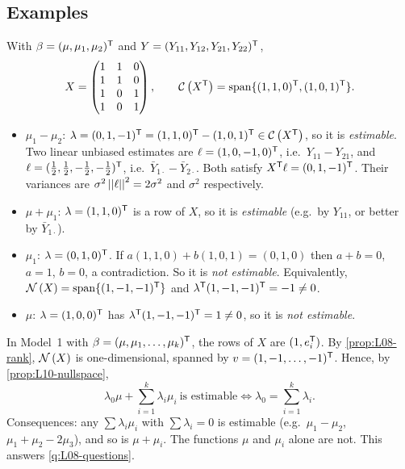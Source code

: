 \subsection{Examples}
\begin{example}[One-way model with $k=2$, $n_1=n_2=2$]\label{ex:L10-oneway}
With $\beta=(\mu,\mu_1,\mu_2)^{\mathsf T}$ and $Y=(Y_{11},Y_{12},Y_{21},Y_{22})^{\mathsf T}$,
\[
X=\begin{pmatrix}1&1&0\\1&1&0\\1&0&1\\1&0&1\end{pmatrix},\qquad
\mathcal{C}\left(X^{\mathsf T}\right)=\mathrm{span}\{(1,1,0)^{\mathsf T},(1,0,1)^{\mathsf T}\}.
\]
\begin{itemize}
  \item $\mu_1-\mu_2$: $\lambda=(0,1,-1)^{\mathsf T}=(1,1,0)^{\mathsf T}-(1,0,1)^{\mathsf T}\in\mathcal{C}\left(X^{\mathsf T}\right)$, so it is \emph{estimable}. Two linear unbiased estimates are $\ell=(1,0,-1,0)^{\mathsf T}$, i.e.\ $Y_{11}-Y_{21}$, and $\ell=(\tfrac12,\tfrac12,-\tfrac12,-\tfrac12)^{\mathsf T}$, i.e.\ $\bar Y_{1\cdot}-\bar Y_{2\cdot}$. Both satisfy $X^{\mathsf T}\ell=(0,1,-1)^{\mathsf T}$. Their variances are $\sigma^2\left|\left|\ell\right|\right|^2=2\sigma^2$ and $\sigma^2$ respectively.
  \item $\mu+\mu_1$: $\lambda=(1,1,0)^{\mathsf T}$ is a row of $X$, so it is \emph{estimable} (e.g.\ by $Y_{11}$, or better by $\bar Y_{1\cdot}$).
  \item $\mu_1$: $\lambda=(0,1,0)^{\mathsf T}$. If $a(1,1,0)+b(1,0,1)=(0,1,0)$ then $a+b=0$, $a=1$, $b=0$, a contradiction. So it is \emph{not estimable}. Equivalently, $\mathcal{N}\left(X\right)=\mathrm{span}\{(1,-1,-1)^{\mathsf T}\}$ and $\lambda^{\mathsf T}(1,-1,-1)^{\mathsf T}=-1\ne0$.
  \item $\mu$: $\lambda=(1,0,0)^{\mathsf T}$ has $\lambda^{\mathsf T}(1,-1,-1)^{\mathsf T}=1\ne 0$, so it is \emph{not estimable}.
\end{itemize}
\end{example}

\begin{example}\label{ex:L10-oneway-general}
In Model~1 with $\beta=(\mu,\mu_1,\dots,\mu_k)^{\mathsf T}$, the rows of $X$ are $(1,e_i^{\mathsf T})$. By
\cref{prop:L08-rank}, $\mathcal{N}\left(X\right)$ is one-dimensional, spanned by $v=(1,-1,\dots,-1)^{\mathsf T}$.
Hence, by \cref{prop:L10-nullspace},
\[
\lambda_0\mu+\sum_{i=1}^k\lambda_i\mu_i\ \text{is estimable}\iff \lambda_0=\sum_{i=1}^k\lambda_i .
\]
Consequences: any  $\sum\lambda_i\mu_i$ with $\sum\lambda_i=0$ is estimable (e.g.\
$\mu_1-\mu_2$, $\mu_1+\mu_2-2\mu_3$), and so is $\mu+\mu_i$. The functions $\mu$ and $\mu_i$ alone are not.
This answers \cref{q:L08-questions}.
\end{example}

